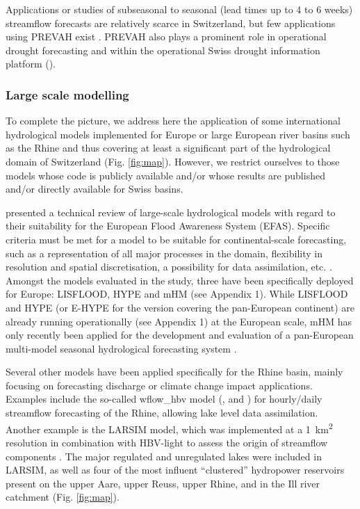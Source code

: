 \documentclass[10pt,a4paper]{article}
\begin{document}
Applications or studies of subseasonal to seasonal (lead times up to 4 to 6 weeks) streamflow forecasts are relatively scarce in Switzerland, but few applications using PREVAH exist \citep[][]{Monhart2019, Anghileri2019}. PREVAH also plays a prominent role in operational drought forecasting \citep{Fundel2013, JorgHess2015, Bogner2018b} and within the operational Swiss drought information platform (\citealp{Stahli2013}). 


\subsubsection{Large scale modelling}
\label{sec:context:largescale}

To complete the picture, we address here the application of some international hydrological models implemented for Europe or large European river basins such as the Rhine and thus covering at least a significant part of the hydrological domain of Switzerland (Fig. \ref{fig:map}). However, we restrict ourselves to those models whose code is publicly available and/or whose results are published and/or directly available for Swiss basins.

\citet{Kauffeldt2016} presented a technical review of large-scale hydrological models with regard to their suitability for the European Flood Awareness System (EFAS). Specific criteria must be met for a model to be suitable for continental-scale forecasting, such as a representation of all major processes in the domain, flexibility in resolution and spatial discretisation, a possibility for data assimilation, etc. \citep{Kauffeldt2016}. Amongst the models evaluated in the study, three have been specifically deployed for Europe: LISFLOOD, HYPE and mHM (see Appendix 1). While LISFLOOD and HYPE (or E-HYPE for the version covering the pan-European continent) are already running operationally (see Appendix 1) at the European scale, mHM has only recently been applied for the development and evaluation of a pan-European multi-model seasonal hydrological forecasting system \citep{Wanders2019}.

Several other models have been applied specifically for the Rhine basin, mainly focusing on forecasting discharge or climate change impact applications. Examples include the so-called wflow\_hbv model (\citealp{vanOsnabrugge2017}, \citealp{vanOsnabrugge2019} and \citealt{vanOsnabrugge2020}) for hourly/daily streamflow forecasting of the Rhine, allowing lake level data assimilation. Another example is the LARSIM model, which was implemented at a 1~km\textsuperscript{2} resolution in combination with HBV-light to assess the origin of streamflow components \citep{Stahl2017}. The major regulated and unregulated lakes were included in LARSIM, as well as four of the most influent ``clustered'' hydropower reservoirs present on the upper Aare, upper Reuss, upper Rhine, and in the Ill river catchment (Fig. \ref{fig:map}).
\end{document}
